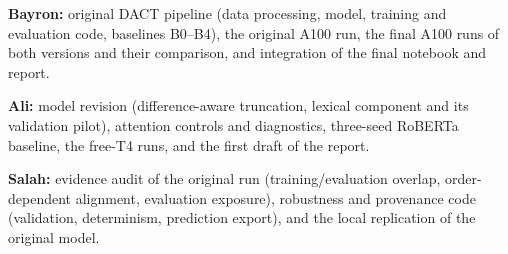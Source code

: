 \documentclass[11pt]{article}
\begin{document}
\textbf{Bayron:} original DACT pipeline (data processing, model, training and evaluation code, baselines B0--B4), the original A100 run, the final A100 runs of both versions and their comparison, and integration of the final notebook and report.

\textbf{Ali:} model revision (difference-aware truncation, lexical component and its validation pilot), attention controls and diagnostics, three-seed RoBERTa baseline, the free-T4 runs, and the first draft of the report.

\textbf{Salah:} evidence audit of the original run (training/evaluation overlap, order-dependent alignment, evaluation exposure), robustness and provenance code (validation, determinism, prediction export), and the local replication of the original model.

\clearpage

\end{document}

